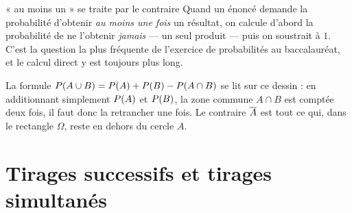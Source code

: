 \begin{methode}{« au moins un » se traite par le contraire}
Quand un énoncé demande la probabilité d'obtenir \emph{au moins une fois} un
résultat, on calcule d'abord la probabilité de ne l'obtenir \emph{jamais} —
un seul produit — puis on soustrait à $1$. C'est la question la plus fréquente
de l'exercice de probabilités au baccalauréat, et le calcul direct y est
toujours plus long.
\end{methode}

\begin{visualisation}
\begin{center}
\end{center}
La formule $P\!\left(A \cup B\right) = P\!\left(A\right)+P\!\left(B\right)-P\!\left(A \cap B\right)$ se lit
sur ce dessin : en additionnant simplement $P\!\left(A\right)$ et $P\!\left(B\right)$, la
zone commune $A \cap B$ est comptée deux fois, il faut donc la retrancher
une fois. Le contraire $\overline{A}$ est tout ce qui, dans le rectangle $\Omega$,
reste en dehors du cercle $A$.
\end{visualisation}

\section{Tirages successifs et tirages simultanés}

